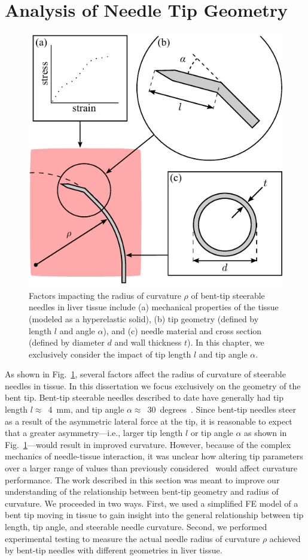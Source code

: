 \section{Analysis of Needle Tip Geometry }
\label{sec:TipGeometryAnalysis}
\begin{figure}[!t]
\centering
\includegraphics[width = 0.6\columnwidth]{Images/Chapter3/CurvatureFactors/CurvatureFactors}%
\caption[Factors impacting steerable needle curvature]{Factors impacting the radius of curvature $\rho$ of bent-tip steerable needles in liver tissue include (a) mechanical properties of the tissue (modeled as a hyperelastic solid), (b) tip geometry (defined by length $l$ and angle $\alpha$), and (c) needle material and cross section (defined by diameter $d$ and wall thickness $t$). In this chapter, we exclusively consider the impact of tip length $l$ and tip angle $\alpha$.}
\label{fig:NSFactors}
\end{figure}
As shown in Fig.~\ref{fig:NSFactors}, several factors affect the radius of curvature of steerable needles in tissue. In this dissertation we focus exclusively on the geometry of the bent tip. Bent-tip steerable needles described to date have generally had tip length $l \approx$~4~mm, and tip angle $\alpha \approx$~30~degrees~\cite{Swaney2013,Rucker2013,Majewicz2012,Patil2014}. Since bent-tip needles steer as a result of the asymmetric lateral force at the tip, it is reasonable to expect that a greater asymmetry---i.e., larger tip length $l$ or tip angle $\alpha$ as shown in Fig.~\ref{fig:NSFactors}---would result in improved curvature. However, because of the complex mechanics of needle-tissue interaction, it was unclear how altering tip parameters over a larger range of values than previously considered~\cite{Majewicz2010} would affect curvature performance. The work described in this section was meant to improve our understanding of the relationship between bent-tip geometry and radius of curvature. We proceeded in two ways. First, we used a simplified FE model of a bent tip moving in tissue to gain insight into the general relationship between tip length, tip angle, and steerable needle curvature. Second, we performed experimental testing to measure the actual needle radius of curvature $\rho$ achieved by bent-tip needles with different geometries in liver tissue.

